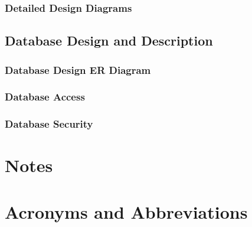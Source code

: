 \documentclass[11pt,a4paper,titlepage]{article}
\begin{document}
\subsubsection{Detailed Design Diagrams}
\subsection{Database Design and Description}
\subsubsection{Database Design ER Diagram}
\subsubsection{Database Access}
\subsubsection{Database Security}

\section{Notes}
\section{Acronyms and Abbreviations}
\end{document}
